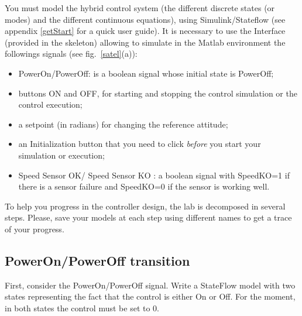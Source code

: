 \documentclass[a4paper]{article}
\begin{document}
You must model the hybrid control system (the different discrete states (or modes) and 
the different continuous equations), using Simulink/Stateflow (see appendix \ref{getStart} 
for a quick user guide).
It is necessary to use the Interface (provided in the skeleton) allowing to simulate in the 
Matlab environment the followings signals (see fig.~\ref{satel}(a)):
\begin{itemize}
\item PowerOn/PowerOff: is a boolean signal whose initial state is PowerOff;
\item buttons ON and OFF, for starting and stopping the control simulation or the control execution;
\item a setpoint (in radians) for changing the reference attitude;
\item an Initialization button that you need to click \emph{before} you start your simulation or execution;
\item Speed Sensor OK/ Speed Sensor KO : a boolean signal with SpeedKO=1 if there is a sensor failure and SpeedKO=0 if the sensor is working well.
\end{itemize}

To help you progress in the controller design, the lab is decomposed in several steps. Please, save
your models at each step using different names to get a trace of your progress.

\subsection{PowerOn/PowerOff transition}
First, consider the PowerOn/PowerOff signal. Write a StateFlow model with two states representing
the fact that the control is either On or Off. For the moment, in both states the control must be set to $0$.
\end{document}
